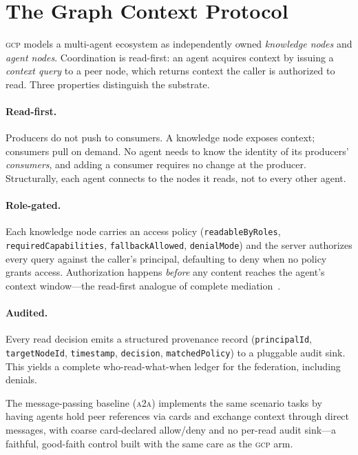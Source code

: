 \documentclass[10pt,twocolumn,letterpaper]{article}
\newcommand{\gcp}{\textsc{gcp}}
\newcommand{\ata}{\textsc{a2a}}
\begin{document}
\section{The Graph Context Protocol}
\label{sec:arch}

\gcp{} models a multi-agent ecosystem as independently owned \emph{knowledge nodes} and
\emph{agent nodes}. Coordination is read-first: an agent acquires context by issuing a
\emph{context query} to a peer node, which returns context the caller is authorized to read. Three
properties distinguish the substrate.

\paragraph{Read-first.} Producers do not push to consumers. A knowledge node exposes context;
consumers pull on demand. No agent needs to know the identity of its producers' \emph{consumers},
and adding a consumer requires no change at the producer. Structurally, each agent connects to the
nodes it reads, not to every other agent.

\paragraph{Role-gated.} Each knowledge node carries an access policy
(\texttt{readableByRoles}, \texttt{requiredCapabilities}, \texttt{fallbackAllowed},
\texttt{denialMode}) and the server authorizes every query against the caller's principal, defaulting
to deny when no policy grants access. Authorization happens \emph{before} any content reaches the
agent's context window---the read-first analogue of complete mediation~\citep{saltzer1975}.

\paragraph{Audited.} Every read decision emits a structured provenance record
(\texttt{principalId}, \texttt{targetNodeId}, \texttt{timestamp}, \texttt{decision},
\texttt{matchedPolicy}) to a pluggable audit sink. This yields a complete who-read-what-when ledger
for the federation, including denials.

The message-passing baseline (\ata{}) implements the same scenario tasks by having agents hold
peer references via cards and exchange context through direct messages, with coarse card-declared
allow/deny and no per-read audit sink---a faithful, good-faith control built with the same care as
the \gcp{} arm.
\end{document}
